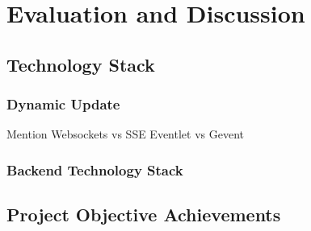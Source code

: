 \chapter{Evaluation and Discussion}

\section{Technology Stack}
\label{sec:eval-tech}

\subsection{Dynamic Update}
Mention Websockets vs SSE
Eventlet vs Gevent

\subsection{Backend Technology Stack}

\section{Project Objective Achievements}
